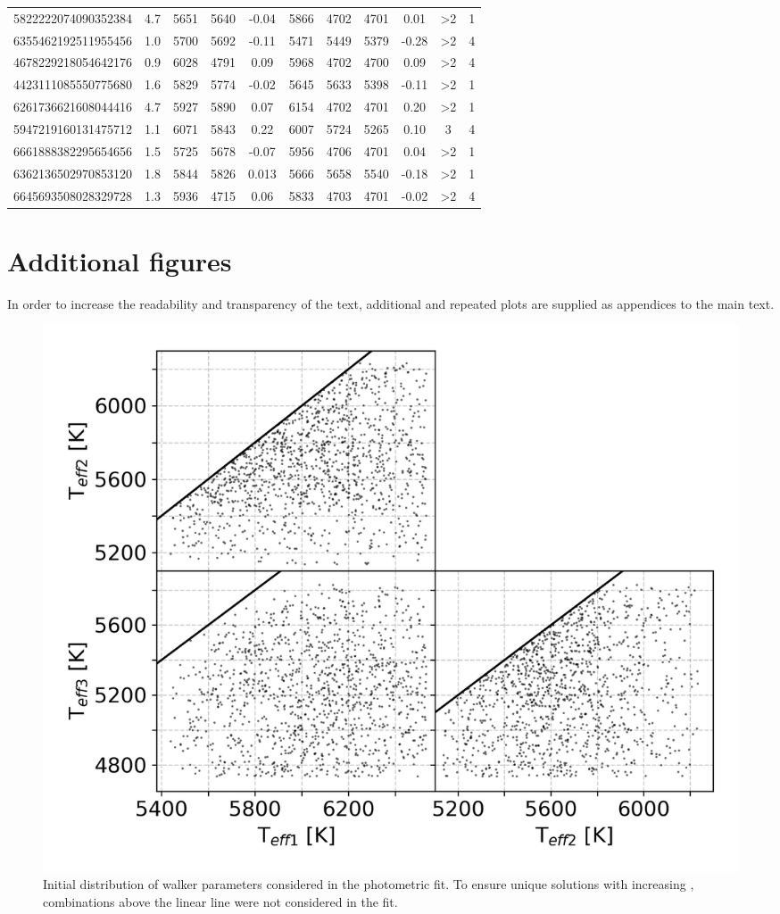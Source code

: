 \begin{table}
\begin{tabular}{ccccccccccc}
		5822222074090352384 & 4.7 & 5651 & 5640 & -0.04 & 5866 & 4702 & 4701 & 0.01 & >2 & 1 \\
		6355462192511955456 & 1.0 & 5700 & 5692 & -0.11 & 5471 & 5449 & 5379 & -0.28 & >2 & 4 \\
		4678229218054642176 & 0.9 & 6028 & 4791 & 0.09 & 5968 & 4702 & 4700 & 0.09 & >2 & 4 \\
		4423111085550775680 & 1.6 & 5829 & 5774 & -0.02 & 5645 & 5633 & 5398 & -0.11 & >2 & 1 \\
		6261736621608044416 & 4.7 & 5927 & 5890 & 0.07 & 6154 & 4702 & 4701 & 0.20 & >2 & 1 \\
		5947219160131475712 & 1.1 & 6071 & 5843 & 0.22 & 6007 & 5724 & 5265 & 0.10 & 3 & 4 \\
		6661888382295654656 & 1.5 & 5725 & 5678 & -0.07 & 5956 & 4706 & 4701 & 0.04 & >2 & 1 \\
		6362136502970853120 & 1.8 & 5844 & 5826 & 0.013 & 5666 & 5658 & 5540 & -0.18 & >2 & 1 \\
		6645693508028329728 & 1.3 & 5936 & 4715 & 0.06 & 5833 & 4703 & 4701 & -0.02 & >2 & 4 \\
		\hline
	\end{tabular}
\end{table}

\section{Additional figures}
In order to increase the readability and transparency of the text, additional and repeated plots are supplied as appendices to the main text.

\begin{figure}
	\centering
	\includegraphics[width=\columnwidth]{150408004101169_p1884_init_3.png}
	\caption{Initial distribution of walker parameters considered in the photometric fit. To ensure unique solutions with increasing \Teff, combinations above the linear line were not considered in the fit.}
	\label{fig:teff_initial_walkers}
\end{figure}

